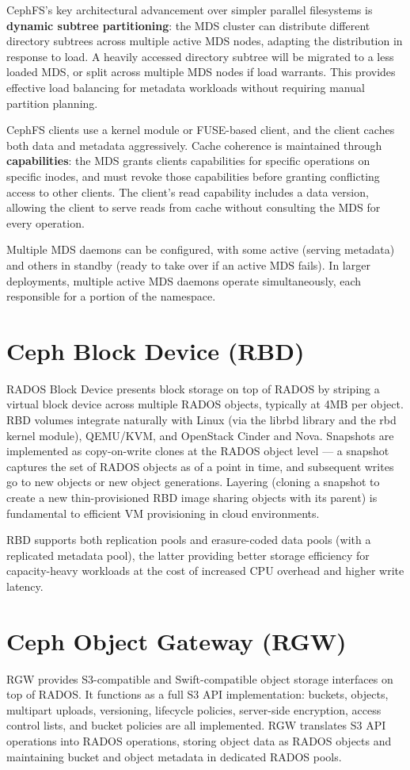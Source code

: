 CephFS's key architectural advancement over simpler parallel filesystems is \textbf{dynamic subtree partitioning}: the MDS cluster can distribute different directory subtrees across multiple active MDS nodes, adapting the distribution in response to load. A heavily accessed directory subtree will be migrated to a less loaded MDS, or split across multiple MDS nodes if load warrants. This provides effective load balancing for metadata workloads without requiring manual partition planning.

CephFS clients use a kernel module or FUSE-based client, and the client caches both data and metadata aggressively. Cache coherence is maintained through \textbf{capabilities}: the MDS grants clients capabilities for specific operations on specific inodes, and must revoke those capabilities before granting conflicting access to other clients. The client's read capability includes a data version, allowing the client to serve reads from cache without consulting the MDS for every operation.

Multiple MDS daemons can be configured, with some active (serving metadata) and others in standby (ready to take over if an active MDS fails). In larger deployments, multiple active MDS daemons operate simultaneously, each responsible for a portion of the namespace.

\section{Ceph Block Device (RBD)}
RADOS Block Device presents block storage on top of RADOS by striping a virtual block device across multiple RADOS objects, typically at 4MB per object. RBD volumes integrate naturally with Linux (via the librbd library and the rbd kernel module), QEMU/KVM, and OpenStack Cinder and Nova. Snapshots are implemented as copy-on-write clones at the RADOS object level --- a snapshot captures the set of RADOS objects as of a point in time, and subsequent writes go to new objects or new object generations. Layering (cloning a snapshot to create a new thin-provisioned RBD image sharing objects with its parent) is fundamental to efficient VM provisioning in cloud environments.

RBD supports both replication pools and erasure-coded data pools (with a replicated metadata pool), the latter providing better storage efficiency for capacity-heavy workloads at the cost of increased CPU overhead and higher write latency.

\section{Ceph Object Gateway (RGW)}
RGW provides S3-compatible and Swift-compatible object storage interfaces on top of RADOS. It functions as a full S3 API implementation: buckets, objects, multipart uploads, versioning, lifecycle policies, server-side encryption, access control lists, and bucket policies are all implemented. RGW translates S3 API operations into RADOS operations, storing object data as RADOS objects and maintaining bucket and object metadata in dedicated RADOS pools.

